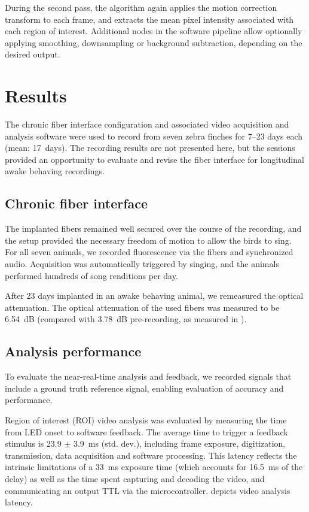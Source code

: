 During the second pass, the algorithm again applies the 
motion correction transform to each frame, and extracts 
the mean pixel intensity associated with each region of 
interest. Additional nodes in the software pipeline allow 
optionally applying smoothing, downsampling or background 
subtraction, depending on the desired output.

\section{Results}

The chronic fiber interface configuration and associated video 
acquisition and analysis software were used to record 
from seven zebra finches for 7--23 days each (mean: 
17~days). The recording results are not 
presented here, but the sessions provided an opportunity to 
evaluate and revise the fiber interface for longitudinal 
awake behaving recordings.

\subsection{Chronic fiber interface}

The implanted fibers remained well secured over the 
course of the recording, and the setup provided the 
necessary freedom of motion to allow the birds to 
sing. For all seven animals, we recorded fluorescence 
via the fibers and synchronized audio. Acquisition 
was automatically triggered by singing, and the 
animals performed hundreds of song renditions per day.

After 23 days implanted in an awake behaving animal,
we remeasured the optical attenuation. The optical 
attenuation of the used fibers was measured to be 
6.54~dB (compared with 3.78~dB pre-recording, as 
measured in ).

\subsection{Analysis performance}

To evaluate the near-real-time analysis and feedback, we recorded 
signals that include a ground truth reference signal, enabling 
evaluation of accuracy and performance.

Region of interest (ROI) video analysis was evaluated by measuring the
time from LED onset to software feedback. The average time to trigger 
a feedback stimulus is 23.9 $\pm$ 3.9~ms (std. dev.), 
including frame exposure, digitization, transmission, data acquisition 
and software processing. This latency reflects the intrinsic 
limitations of a 33~ms exposure time (which accounts for 16.5~ms of 
the delay) as well as the time spent capturing and decoding the video, 
and communicating an output TTL via the microcontroller. 
 depicts video analysis latency.

